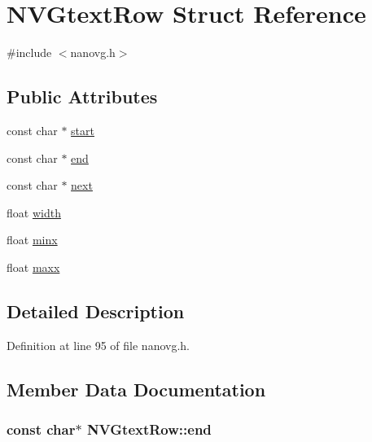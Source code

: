 \hypertarget{struct_n_v_gtext_row}{\section{N\+V\+Gtext\+Row Struct Reference}
\label{struct_n_v_gtext_row}
}


{\ttfamily \#include $<$nanovg.\+h$>$}

\subsection*{Public Attributes}
\begin{DoxyCompactItemize}
\item 
const char $\ast$ \hyperlink{struct_n_v_gtext_row_ae0d868be9f65a22eba6fc01f969aea0b}{start}
\item 
const char $\ast$ \hyperlink{struct_n_v_gtext_row_a4782f1bdd45f50679efaec4f1e3e73fa}{end}
\item 
const char $\ast$ \hyperlink{struct_n_v_gtext_row_a593a3eec246cf91ddad5617132b3d916}{next}
\item 
float \hyperlink{struct_n_v_gtext_row_a94481448fed11625d1aeb56531ecf3a0}{width}
\item 
float \hyperlink{struct_n_v_gtext_row_ace83ebb3ae1a6c14d7104284d4813d7c}{minx}
\item 
float \hyperlink{struct_n_v_gtext_row_a022c194fd146e8cf80be30a183f64871}{maxx}
\end{DoxyCompactItemize}


\subsection{Detailed Description}


Definition at line 95 of file nanovg.\+h.



\subsection{Member Data Documentation}
\hypertarget{struct_n_v_gtext_row_a4782f1bdd45f50679efaec4f1e3e73fa}{
\subsubsection[{end}]{\setlength{\rightskip}{0pt plus 5cm}const char$\ast$ N\+V\+Gtext\+Row\+::end}}\label{struct_n_v_gtext_row_a4782f1bdd45f50679efaec4f1e3e73fa}



